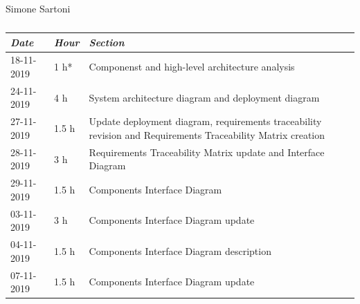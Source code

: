 \documentclass[a4paper]{report}
\begin{document}
\vspace*{1 cm}
\begin{table}[H]
\centering
Simone Sartoni \\
\begin{tabular}{p{2cm}p{1.5cm}p{7cm}}
\toprule
\textit{Date} & \textit{Hour} & \textit{Section} \\ \midrule
18-11-2019 & 1 h* & Componenst and high-level architecture analysis \\ \midrule
24-11-2019 & 4 h &  System architecture diagram and deployment diagram\\ \midrule
27-11-2019 & 1.5 h & Update deployment diagram, requirements traceability revision and Requirements Traceability Matrix creation \\ \midrule
28-11-2019 & 3 h & Requirements Traceability Matrix update and Interface Diagram \\ \midrule
29-11-2019 & 1.5 h & Components Interface Diagram \\ \midrule
03-11-2019 & 3 h & Components Interface Diagram update \\ \midrule
04-11-2019 & 1.5 h & Components Interface Diagram description \\ \midrule
07-11-2019 & 1.5 h & Components Interface Diagram update \\ \midrule

\bottomrule
\end{tabular}
\caption[Simone Sartoni's effort table]{}
\end{table}
\vspace*{1 cm}
\end{document}
